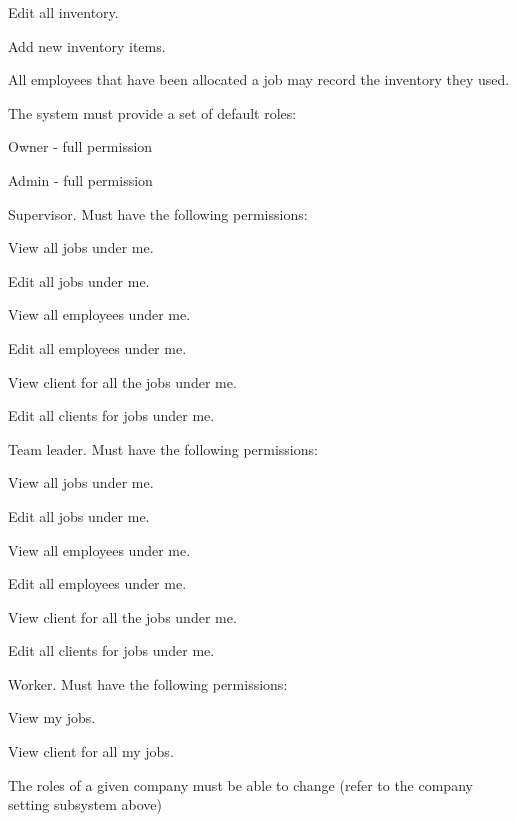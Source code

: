 \documentclass{article}
\begin{document}
\begin{list}{R.}{}
\begin{list}{R.}{}
\begin{list}{R...}{}
				\item Edit all inventory.
				\item Add new inventory items.
				\item All employees that have been allocated a job may record the inventory they used.
			\end{list}
		\end{list} 
		\item The system must provide a set of default roles:
		\begin{list}{R.}{}
			\item Owner - full permission
			\item Admin - full permission
			\item Supervisor. Must have the following permissions:
			\begin{list}{R...}{}
				\item View all jobs under me.
				\item Edit all jobs under me.
				\item View all employees under me.
				\item Edit all employees under me.
				\item View client for all the jobs under me.
				\item Edit all clients for jobs under me.
			\end{list}
			\item Team leader. Must have the following permissions:
			\begin{list}{R...}{}
				\item View all jobs under me.
				\item Edit all jobs under me.
				\item View all employees under me.
				\item Edit all employees under me.
				\item View client for all the jobs under me.
				\item Edit all clients for jobs under me.
			\end{list}
			\item Worker. Must have the following permissions:
			\begin{list}{R...}{}
				\item View my jobs.
				\item View client for all my jobs.
			\end{list}
		\end{list} 
		\item The roles of a given company must be able to change (refer to the company setting subsystem above)
	\end{list}
	
\end{document}

